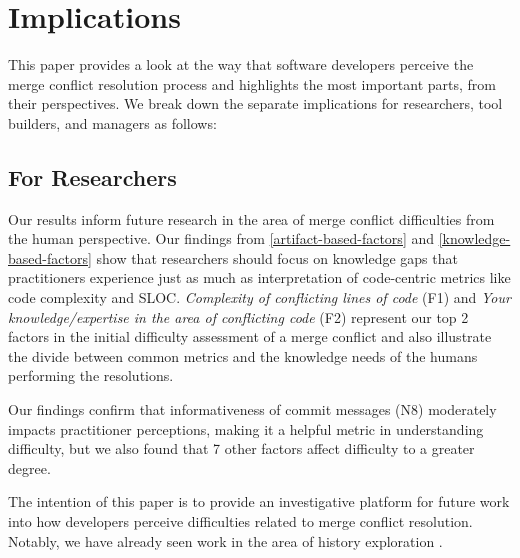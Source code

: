 \section{Implications}\label{implications}

This paper provides a look at the way that software developers perceive the merge conflict resolution process and highlights the most important parts, from their perspectives. We break down the separate implications for researchers, tool builders, and managers as follows:

\subsection{For Researchers}
Our results inform future research in the area of merge conflict difficulties from the human perspective.
Our findings from \ref{artifact-based-factors} and \ref{knowledge-based-factors} show that researchers should focus on knowledge gaps that practitioners experience just as much as interpretation of code-centric metrics like code complexity and SLOC. \textit{Complexity of conflicting lines of code} (F1) and \textit{Your knowledge/expertise in the area of conflicting code} (F2) represent our top 2 factors in the initial difficulty assessment of a merge conflict and also illustrate the divide between common metrics and the knowledge needs of the humans performing the resolutions.
 
Our findings confirm that informativeness of commit messages (N8) moderately impacts practitioner perceptions, making it a helpful metric in understanding difficulty, but we also found that 7 other factors affect difficulty to a greater degree.
 
The intention of this paper is to provide an investigative platform for future work into how developers perceive difficulties related to merge conflict resolution. Notably, we have already seen work in the area of history exploration \cite{mihai_lenses}.


